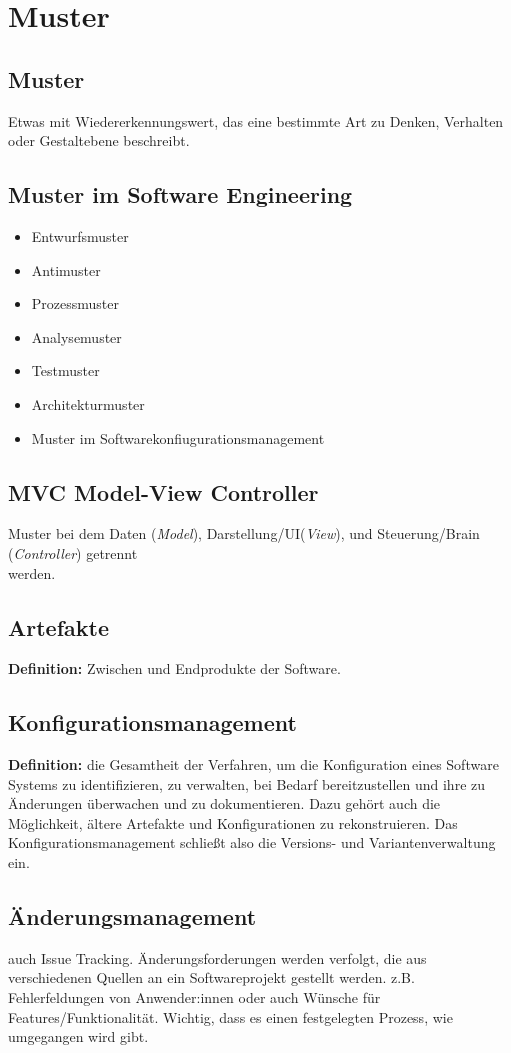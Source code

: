 \documentclass{book}
\begin{document}
    \section{Muster}
    \subsection{Muster}
    Etwas mit Wiedererkennungswert, das eine bestimmte Art zu Denken, Verhalten oder Gestaltebene beschreibt.

    \subsection{Muster im Software Engineering}
    \begin{itemize}
        \item Entwurfsmuster
        \item Antimuster
        \item Prozessmuster
        \item Analysemuster
        \item Testmuster
        \item Architekturmuster
        \item Muster im Softwarekonfiugurationsmanagement
    \end{itemize}
    \subsection{\textbf{MVC} Model-View Controller}
    Muster bei dem Daten (\textit{Model}), Darstellung/UI(\textit{View}), und Steuerung/Brain (\textit{Controller}) getrennt \\werden.
    \subsection{Artefakte}
    \textbf{Definition:} Zwischen und Endprodukte der Software.

    \subsection{Konfigurationsmanagement}
    \textbf{Definition:} die Gesamtheit der Verfahren, um die Konfiguration eines Software Systems zu identifizieren, zu verwalten, bei Bedarf bereitzustellen und ihre zu Änderungen überwachen und zu dokumentieren.
    Dazu gehört auch die Möglichkeit, ältere Artefakte und Konfigurationen zu rekonstruieren.
    Das Konfigurationsmanagement schließt also die Versions- und Variantenverwaltung ein. \subsection{Änderungsmanagement}
    auch Issue Tracking. Änderungsforderungen werden verfolgt, die aus verschiedenen Quellen an ein Softwareprojekt gestellt werden.
    z.B. Fehlerfeldungen von Anwender:innen oder auch Wünsche für Features/Funktionalität.
    Wichtig, dass es einen festgelegten Prozess, wie umgegangen wird gibt.
\end{document}
